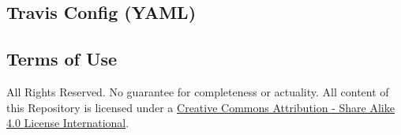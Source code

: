 \documentclass[10pt,letterpaper]{article}
\begin{document}
\subsection{Travis Config (YAML)}\label{travis-config-yaml}



\subsection{Terms of Use}\label{terms-of-use}

All Rights Reserved. No guarantee for completeness or actuality. All
content of this Repository is licensed under a
\href{http://creativecommons.org/licenses/by-sa/4.0/}{Creative Commons
Attribution - Share Alike 4.0 License International}.
\end{document}
